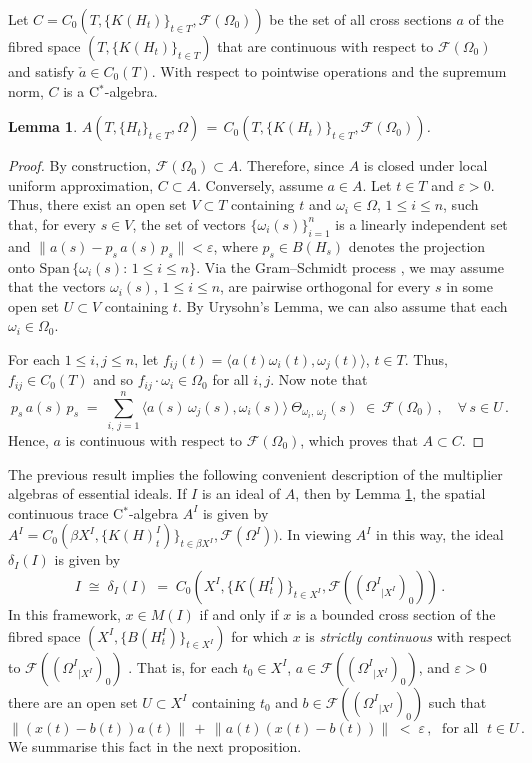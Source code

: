 \documentclass{amsart}
\newtheorem{lemma}[theorem]{Lemma}
\theoremstyle{definition}
\theoremstyle{remark}
\begin{document}
Let $C=C_0(T,\{K(H_t)\}_{t\in T},{\mathcal{F}}(\Omega_0))$ be the set of all cross sections $a$
of the fibred space $(T,\{ K(H_t)\}_{t\in T})$ that are continuous with respect to ${\mathcal{F}}(\Omega_0)$ and satisfy $\check{a}\in C_0(T)$.
With respect to pointwise operations and the supremum norm, $C$ is a C$^*$-algebra.

\begin{lemma}\label{C=A}
$A(T,\{H_t\}_{t\in T},\Omega)\,=\,C_0(T,\{K(H_t)\}_{t\in T},{\mathcal{F}}(\Omega_0))$.
\end{lemma}

\begin{proof} By construction,
${\mathcal{F}}(\Omega_0)\subset A$. Therefore, since $A$ is closed under local uniform approximation,  $C\subset A$.
Conversely, assume $a\in A$. Let $t\in T$ and $\varepsilon>0$. Thus, there exist an open set $V\subset T$ containing $t$
and $\omega_i\in \Omega$, $1\leq i\leq n$, such that, for every $s\in V$, the set of vectors
 $\{\omega_i(s)\}_{i=1}^n$ is a linearly independent set
and $\|a(s)-p_s \, a(s)\, p_s\|<\varepsilon$, where $p_s\in B(H_s)$ denotes the
projection onto $\mbox{Span}\,\{\omega_i(s):\, 1\leq i\leq n\}$.
Via the Gram--Schmidt process \cite[Lemma 4.2]{fell1961}, we may assume that the vectors  $\omega_i(s)$, $1\leq i\leq n$,
are pairwise orthogonal for every $s$ in some open set $U\subset V$ containing $t$. By Urysohn's Lemma,
we can also assume that each $\omega_i\in \Omega_0$.

For each $1\leq i,j\leq n$, let $f_{ij}(t)=\langle a(t)\omega_i(t),\omega_j(t)\rangle$, $t\in T$.
Thus,  $f_{ij}\in C_0(T)$ and so $f_{ij}\cdot\omega_i\in \Omega_0$ for all $i,j$. Now note that
\[
p_s \,a(s)\, p_s\;=\;\sum_{i,\,j=1}^n \langle a(s)\,\omega_j(s),\omega_i(s)\rangle\ \Theta_{\omega_i,\,\omega_j}(s)
\;\in\, \mathcal F(\Omega_0)\,,\quad\forall\,s\in U\,.
\]
Hence, $a$ is continuous with respect to $\mathcal F(\Omega_0)$, which proves that $A\subset C$.
\end{proof}

The previous result implies the following convenient description of the multiplier algebras of essential ideals.
If $I$ is an ideal of $A$, then  by Lemma \ref{C=A}, the spatial continuous trace C$^*$-algebra $A^I$ is given
by $A^I=C_0(\beta X^I,\{K(H)_t^I)\}_{t\in \beta X^I},{\mathcal{F}}(\Omega^I))$. In viewing $A^I$ in this way,
the ideal $\delta_I(I)$ is given by
\[
I\;\cong\; \delta_I(I)\;=\;C_0 \left(X^I,\{K(H^I_t)\}_{t\in X^I},{\mathcal{F}}((\Omega^I{}_{\vert X^I})_0) \right)\,.
\]
In this framework,
$x\in M(I)$ if and only if $x$ is a bounded cross
section of the fibred space $(X^I,\{B(H^I_t)\}_{t\in X^I})$ for which $x$
is \emph{strictly continuous} with respect to ${\mathcal{F}}((\Omega^I{}_{\vert X^I})_0)$
\cite[Theorem 3.3]{akemann--pedersen--tomiyama1973}.
That is, for each $t_0\in X^I$, $a\in {\mathcal{F}}((\Omega^I{}_{\vert X^I})_0)$, and $\varepsilon>0$ there are an open set
$U\subset X^I$ containing $t_0$ and $b\in {\mathcal{F}}((\Omega^I{}_{\vert X^I})_0)$ such that
\[
\|\left( x(t)-b(t)\right)a(t)\|\,+\,\|a(t)\left( x(t)-b(t)\right)\|\;<\;\varepsilon\,,\;\mbox{ for all }\;t\in U\,.
\]
We summarise this fact in the next proposition.
\end{document}
